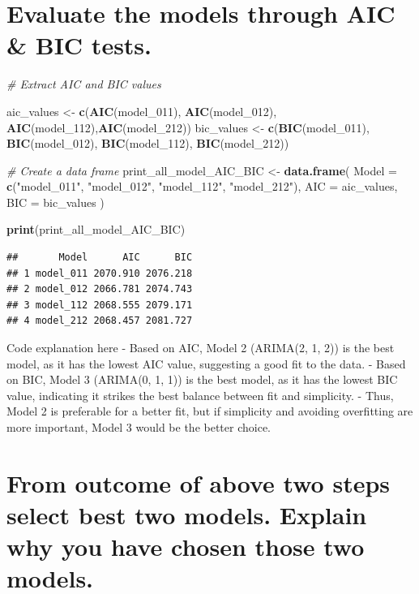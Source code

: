 \documentclass[
]{book}
\newenvironment{Shaded}{\begin{snugshade}}{\end{snugshade}}
\newcommand{\AttributeTok}[1]{\textcolor[rgb]{0.13,0.29,0.53}{#1}}
\newcommand{\CommentTok}[1]{\textcolor[rgb]{0.56,0.35,0.01}{\textit{#1}}}
\newcommand{\FunctionTok}[1]{\textcolor[rgb]{0.13,0.29,0.53}{\textbf{#1}}}
\newcommand{\NormalTok}[1]{#1}
\newcommand{\OtherTok}[1]{\textcolor[rgb]{0.56,0.35,0.01}{#1}}
\newcommand{\StringTok}[1]{\textcolor[rgb]{0.31,0.60,0.02}{#1}}
\begin{document}
\section{Evaluate the models through AIC \& BIC tests.}\label{evaluate-the-models-through-aic-bic-tests.}

\begin{Shaded}
\begin{Highlighting}[]
\CommentTok{\# Extract AIC and BIC values}


\NormalTok{aic\_values }\OtherTok{\textless{}{-}} \FunctionTok{c}\NormalTok{(}\FunctionTok{AIC}\NormalTok{(model\_011), }\FunctionTok{AIC}\NormalTok{(model\_012), }\FunctionTok{AIC}\NormalTok{(model\_112),}\FunctionTok{AIC}\NormalTok{(model\_212))}
\NormalTok{bic\_values }\OtherTok{\textless{}{-}} \FunctionTok{c}\NormalTok{(}\FunctionTok{BIC}\NormalTok{(model\_011), }\FunctionTok{BIC}\NormalTok{(model\_012), }\FunctionTok{BIC}\NormalTok{(model\_112), }\FunctionTok{BIC}\NormalTok{(model\_212))}

\CommentTok{\# Create a data frame}
\NormalTok{print\_all\_model\_AIC\_BIC }\OtherTok{\textless{}{-}} \FunctionTok{data.frame}\NormalTok{(}
  \AttributeTok{Model =} \FunctionTok{c}\NormalTok{(}\StringTok{"model\_011"}\NormalTok{, }\StringTok{"model\_012"}\NormalTok{, }\StringTok{"model\_112"}\NormalTok{, }\StringTok{"model\_212"}\NormalTok{),}
  \AttributeTok{AIC =}\NormalTok{ aic\_values,}
  \AttributeTok{BIC =}\NormalTok{ bic\_values}
\NormalTok{)}

\FunctionTok{print}\NormalTok{(print\_all\_model\_AIC\_BIC)}
\end{Highlighting}
\end{Shaded}

\begin{verbatim}
##       Model      AIC      BIC
## 1 model_011 2070.910 2076.218
## 2 model_012 2066.781 2074.743
## 3 model_112 2068.555 2079.171
## 4 model_212 2068.457 2081.727
\end{verbatim}

Code explanation here
- Based on AIC, Model 2 (ARIMA(2, 1, 2)) is the best model, as it has the lowest AIC value, suggesting a good fit to the data.
- Based on BIC, Model 3 (ARIMA(0, 1, 1)) is the best model, as it has the lowest BIC value, indicating it strikes the best balance between fit and simplicity.
- Thus, Model 2 is preferable for a better fit, but if simplicity and avoiding overfitting are more important, Model 3 would be the better choice.

\section{From outcome of above two steps select best two models. Explain why you have chosen those two models.}\label{from-outcome-of-above-two-steps-select-best-two-models.-explain-why-you-have-chosen-those-two-models.}
\end{document}
